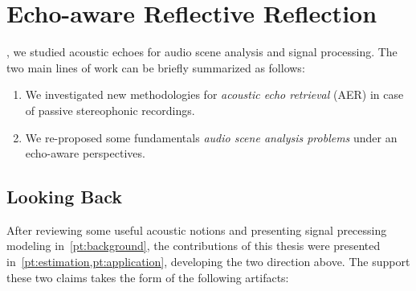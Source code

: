 \chapter{Echo-aware Reflective Reflection}\label{ch:conclusion}

\vspace{-2.5em}
, we studied acoustic echoes for audio scene analysis and signal processing.
The two main lines of work can be briefly summarized as follows:
\begin{enumerate}[label=\Alph*.]
    \item We investigated new methodologies for \textit{acoustic echo retrieval} (AER) in case of passive stereophonic recordings.
    \item We re-proposed some fundamentals \textit{audio scene analysis problems} under an echo-aware perspectives.
\end{enumerate}

\section{Looking Back}
After reviewing some useful acoustic notions and presenting signal precessing modeling in~\cref{pt:background}, the contributions of this thesis were presented in~\cref{pt:estimation,pt:application},
developing the two direction above. The support these two claims takes the form of the following artifacts:

